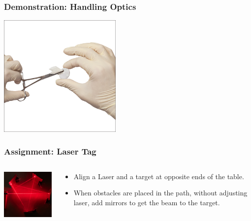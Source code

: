 \documentclass{beamer}
\begin{document}
\begin{frame}\frametitle{Demonstration: Handling Optics}
\begin{center}
\includegraphics[width=6cm]{fig/opticscleaning.jpg}
\end{center}
\end{frame}

\begin{frame}\frametitle{Assignment: Laser Tag}
\begin{columns}
\begin{column}{5cm}
\begin{center}
\includegraphics[width=4.5cm]{fig/lasertag.jpg}
\end{center}
\end{column}
\begin{column}{7cm}
\begin{itemize}
\item Align a Laser and a target at opposite ends of the table.
\item When obstacles are placed in the path, without adjusting laser, add mirrors to get the beam to the target.
\end{itemize}
\end{column}

\end{columns}
\end{frame}
\end{document}
